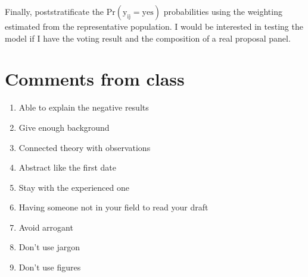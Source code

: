 \documentclass[12pt,letterpaper]{article}
\begin{document}
Finally, poststratificate the $\mathrm{Pr(y_{ij} = yes)}$ probabilities using the 
weighting estimated from the representative population.
I would be interested in testing the model if I have the voting result and the composition of a real proposal panel.

\section*{Comments from class}

\begin{enumerate}
    \item Able to explain the negative results
    \item Give enough background
    \item Connected theory with observations
    \item Abstract like the first date
    \item Stay with the experienced one
    \item Having someone not in your field to read your draft
    \item Avoid arrogant
    \item Don't use jargon
    \item Don't use figures
\end{enumerate}
\end{document}
